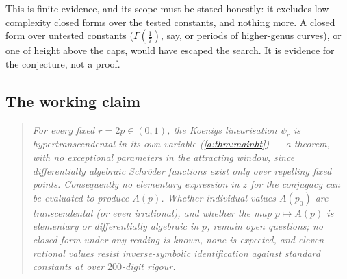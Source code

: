 This is finite evidence, and its scope must be stated honestly: it excludes
low-complexity closed forms over the tested constants, and nothing more. A closed
form over untested constants ($\Gamma(\tfrac17)$, say, or periods of higher-genus
curves), or one of height above the caps, would have escaped the search. It is
evidence for the conjecture, not a proof.

\subsection{The working claim}
\label{a:sec:workingclaim}

\begin{quote}
\textit{For every fixed $r=2p\in(0,1)$, the Koenigs linearisation $\psi_r$ is
hypertranscendental in its own variable (\cref{a:thm:mainht}) --- a theorem, with
no exceptional parameters in the attracting window, since differentially algebraic
Schr\"oder functions exist only over repelling fixed points. Consequently no
elementary expression in $z$ for the conjugacy can be evaluated to produce $A(p)$.
Whether individual values $A(p_0)$ are transcendental (or even irrational), and
whether the map $p\mapsto A(p)$ is elementary or differentially algebraic in $p$,
remain open questions; no closed form under any reading is known, none is
expected, and eleven rational values resist inverse-symbolic identification
against standard constants at over $200$-digit rigour.}
\end{quote}
